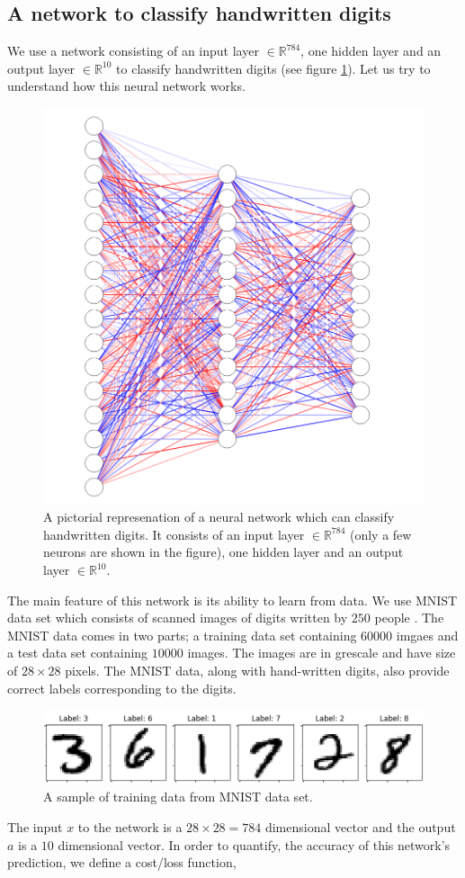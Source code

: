 \subsection{A network to classify handwritten digits}
We use a network consisting of an input layer $\in \mathbb{R}^{784}$, one hidden layer and an output layer $\in \mathbb{R}^{10}$ to classify handwritten
digits (see figure \ref{fig:NN_HD}). Let us try to understand how this neural network works. 
\begin{figure}[htbp]
    \centering
    \includegraphics[width=.4\textwidth]{Figures/NN_2.png}
    \caption{A pictorial represenation of a neural network which can classify handwritten digits. It consists of an input layer $\in \mathbb{R}^{784}$ (only a few neurons are shown in the figure), one hidden layer and an output layer $\in \mathbb{R}^{10}$.}
    \label{fig:NN_HD}
\end{figure} 
The main feature of this network is its ability to learn from data. We use MNIST data set which consists of scanned images of digits written by $250$ people \cite{lecun1998mnist}. The MNIST data
comes in two parts; a training data set containing $60000$ imgaes and a test data set containing $10000$ images. The images are in grescale and have size of $28 \times 28$ pixels.
The MNIST data, along with hand-written digits, also provide correct labels corresponding to the digits. 
\begin{figure}[htbp]
    \centering
    \includegraphics[width=.4\textwidth]{Figures/mnist_data_sample.png}
    \caption{A sample of training data from MNIST data set.}
    \label{fig:mnist_data}
\end{figure} 
The input $x$ to the network is a $28 \times 28 = 784$ dimensional vector and the output $a$ is a $10$ dimensional vector. In order to quantify, the 
accuracy of this network's prediction, we define a cost/loss function,
